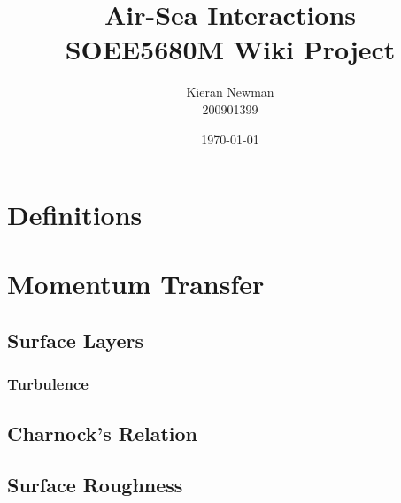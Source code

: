 \documentclass{report}
\begin{document}
  
  \title{Air-Sea Interactions\\SOEE5680M Wiki Project} 
  \author{Kieran Newman\\200901399}
  \date{\small\today}
  \maketitle
  
  \ifdefined\HCode
  \fi
  
  \tableofcontents
  
  \ifdefined\HCode
  \fi
  
  \chapter{Definitions} 
  \ifdefined\HCode
  \else
  {
  \startcontents[chapter]
  }
  \fi
    \lipsum[10]

\citep{benjamin67}    
   
  \ifdefined\HCode
  \fi
  
  \ifdefined\HCode
  \else
  {
  \stopcontents[chapter]
  } 
  \fi
  
  
  \chapter{Momentum Transfer}
    \lipsum[10]
  
    \section{Surface Layers}
    \lipsum[1-2]

   \subsection{Turbulence} 
    \lipsum[1-2]

    \section{Charnock's Relation}
    \lipsum[1-2]
  
    \section{Surface Roughness}
    \lipsum[1-2]
\end{document}
